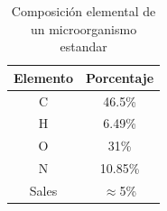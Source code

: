 \begin{table}[H]
\centering
\caption{Composición elemental de un microorganismo estandar}
\label{tab:comp_est_micro}
\begin{threeparttable}
{
\begin{tabular}{cc}\hline
    
    \bfseries{Elemento} & \bfseries{Porcentaje} \\ \hline
    
    C & 46.5\% \\
    H & 6.49\% \\
    O & 31\% \\
    N & 10.85\% \\
    Sales & $\approx$5\% \\
    
    \hline
\end{tabular}
}
\begin{tablenotes}
    \item[] 
\end{tablenotes}
\end{threeparttable}
\end{table}